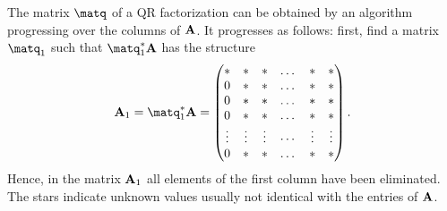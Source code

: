 \begin{intro}
  \label{intro:ortho:1}
  The matrix $\matq$ of a QR factorization can be obtained by an
  algorithm progressing over the columns of $\mathbf A$. It progresses as
  follows: first, find a matrix $\matq_1$ such that $\matq_1^*\mata$
  has the structure
  \begin{gather}
    \mata_1 = \matq_1^* \mata =
    \begin{pmatrix}
      * & * & * & \dots & * & * \\
      0 & * & * & \dots & * & * \\
      0 & * & * & \dots & * & * \\
      0 & * & * & \dots & * & * \\
      \vdots & \vdots & \vdots & \cdots & \vdots & \vdots \\
      0 & * & * & \dots & * & *
    \end{pmatrix}.
  \end{gather}
  Hence, in the matrix $\mathbf A_1$ all elements of the first column have
  been eliminated. The stars indicate unknown values usually not
  identical with the entries of $\mathbf A$.


\end{intro}
